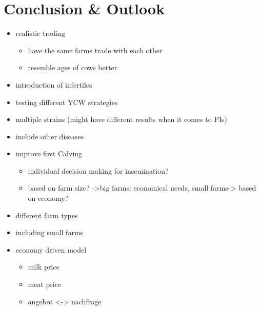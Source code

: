 \chapter{Conclusion \& Outlook}
\begin{itemize}
\item realistic trading
\begin{itemize}
\item have the same farms trade with each other
\item resemble ages of cows better
\end{itemize}
\item introduction of infertiles
\item testing different YCW strategies
\item multiple strains (might have different results when it comes to PIs)
\item include other diseases 
\item improve first Calving 
\begin{itemize}
\item individual decision making for insemination? 
\item based on farm size? ->big farms: economical needs, small farms-> based on economy?
\end{itemize}
\item different farm types
\item including small farms
\item economy driven model
\begin{itemize}
\item milk price
\item meat price
\item angebot <-> nachfrage
\end{itemize}
\end{itemize}


